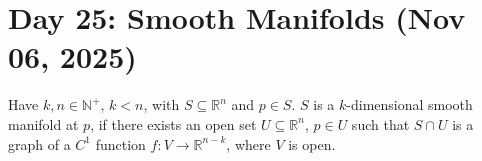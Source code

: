 \section{Day 25: Smooth Manifolds (Nov 06, 2025)}

\begin{definition}
Have $k, n \in \mathbb{N}^+$, $k < n$, with $S \subseteq \mathbb{R}^n$ and $p \in S$. $S$ is a $k$-dimensional smooth manifold at $p$, if there exists an open set $U \subseteq \mathbb{R}^n$, $p \in U$ such that
    $S \cap U$ is a graph of a $C^1$ function $f: V \to \mathbb{R}^{n-k}$, where $V$ is open. 
\end{definition}

